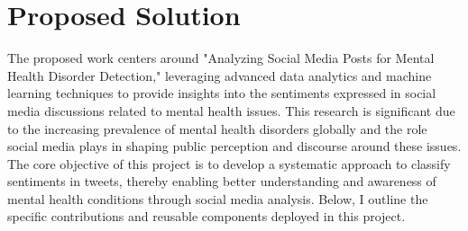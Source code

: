 \section{Proposed Solution}
\noindent
The proposed work centers around "Analyzing Social Media Posts for Mental Health Disorder Detection," leveraging advanced data analytics and machine learning techniques to provide insights into the sentiments expressed in social media discussions related to mental health issues. This research is significant due to the increasing prevalence of mental health disorders globally and the role social media plays in shaping public perception and discourse around these issues. The core objective of this project is to develop a systematic approach to classify sentiments in tweets, thereby enabling better understanding and awareness of mental health conditions through social media analysis. Below, I outline the specific contributions and reusable components deployed in this project.


